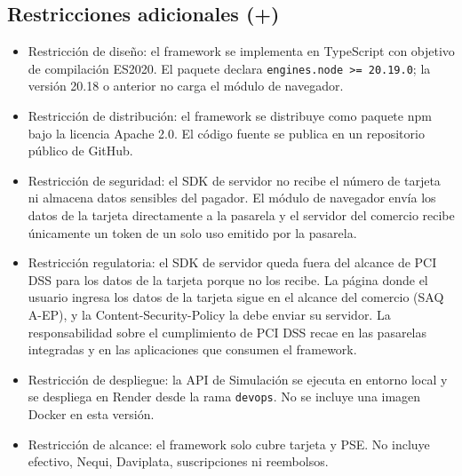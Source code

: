 \subsection{Restricciones adicionales (+)}

\begin{itemize}
  \item Restricción de diseño: el framework se implementa en TypeScript con objetivo de compilación ES2020. El paquete declara \texttt{engines.node >= 20.19.0}; la versión 20.18 o anterior no carga el módulo de navegador.
  \item Restricción de distribución: el framework se distribuye como paquete npm bajo la licencia Apache 2.0. El código fuente se publica en un repositorio público de GitHub.
  \item Restricción de seguridad: el SDK de servidor no recibe el número de tarjeta ni almacena datos sensibles del pagador. El módulo de navegador envía los datos de la tarjeta directamente a la pasarela y el servidor del comercio recibe únicamente un token de un solo uso emitido por la pasarela.
  \item Restricción regulatoria: el SDK de servidor queda fuera del alcance de PCI DSS para los datos de la tarjeta porque no los recibe. La página donde el usuario ingresa los datos de la tarjeta sigue en el alcance del comercio (SAQ A-EP), y la Content-Security-Policy la debe enviar su servidor. La responsabilidad sobre el cumplimiento de PCI DSS recae en las pasarelas integradas y en las aplicaciones que consumen el framework.
  \item Restricción de despliegue: la API de Simulación se ejecuta en entorno local y se despliega en Render desde la rama \texttt{devops}. No se incluye una imagen Docker en esta versión.
  \item Restricción de alcance: el framework solo cubre tarjeta y PSE. No incluye efectivo, Nequi, Daviplata, suscripciones ni reembolsos.
\end{itemize}
